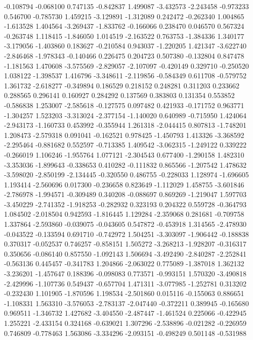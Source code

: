 -0.108794
-0.068100
0.747135
-0.842837
1.499087
-3.432573
-2.243458
-0.973233
0.546700
-0.785730
1.459215
-3.129891
-1.312089
0.242472
-0.262340
1.004865
-1.613528
1.404564
-3.269437
-1.833762
-0.166066
0.238470
0.046570
0.567324
-0.263748
1.118415
-1.846050
1.014519
-2.163522
0.763753
-1.384336
1.340177
-3.179056
-1.403860
0.183627
-0.210584
0.943037
-1.220205
1.421347
-3.622740
-2.846468
-1.978343
-0.140466
0.226475
0.204723
0.507380
-0.132804
0.847478
-1.181563
1.470608
-3.575569
-2.829057
-2.107097
-0.420149
0.329710
-0.250520
1.038122
-1.398537
1.416796
-3.348611
-2.119856
-0.584349
0.611708
-0.579752
1.361732
-2.618277
-0.349894
0.186529
0.218152
0.248281
0.311203
0.233662
0.288565
0.296141
0.160927
0.284292
0.137569
0.383803
0.131354
0.553852
-0.586838
1.253007
-2.585618
-0.127575
0.097482
0.421933
-0.171752
0.963771
-1.304257
1.523203
-3.313024
-2.377154
-1.140020
0.640989
-0.715950
1.424064
-2.943173
-1.160733
0.453992
-0.355944
1.261318
-2.044415
0.807813
-1.748201
1.208473
-2.579318
0.091041
-0.162521
0.978425
-1.450793
1.413326
-3.368592
-2.295464
-0.881682
0.552597
-0.713385
1.409542
-3.062315
-1.249122
0.339222
-0.266019
1.106246
-1.955764
1.077121
-2.304543
0.677400
-1.290158
1.482310
-3.353036
-1.899643
-0.338653
0.410282
-0.111832
0.865566
-1.207542
1.478632
-3.598020
-2.850199
-2.134445
-0.320550
0.486755
-0.228033
1.128974
-1.696605
1.193414
-2.560696
0.017300
-0.236658
0.823649
-1.112029
1.458755
-3.601846
-2.786978
-1.994571
-0.309489
0.340208
-0.088697
0.869269
-1.219047
1.597703
-3.450229
-2.741352
-1.918253
-0.282932
0.323193
0.204322
0.559728
-0.364793
1.084502
-2.018504
0.942593
-1.816445
1.129284
-2.359068
0.281681
-0.709758
1.337864
-2.593860
-0.039075
-0.043605
0.547872
-0.453918
1.314565
-2.478930
-0.043522
-0.133594
0.691710
-0.742972
1.504251
-3.303097
-1.906442
-0.188838
0.370317
-0.052537
0.746257
-0.858151
1.505272
-3.268213
-1.928207
-0.316317
0.350656
-0.086140
0.857550
-1.092143
1.506694
-3.492490
-2.840287
-2.252841
-0.563136
0.445457
-0.341783
1.204866
-2.063022
0.775089
-1.387018
1.362132
-3.236201
-1.457647
0.188396
-0.098083
0.773571
-0.993151
1.570320
-3.490818
-2.429996
-1.107736
0.549437
-0.657704
1.471311
-3.077985
-1.252781
0.313202
-0.232430
1.101905
-1.870596
1.198534
-2.501860
0.015116
-0.155063
0.886651
-1.108331
1.563310
-3.576053
-2.783137
-2.047440
-0.372211
0.389945
-0.165680
0.969511
-1.346732
1.427682
-3.404550
-2.487447
-1.461524
0.225066
-0.422945
1.255221
-2.433154
0.324168
-0.639021
1.307296
-2.538896
-0.021282
-0.226959
0.746809
-0.778463
1.563086
-3.334296
-2.093151
-0.498249
0.501148
-0.531988
